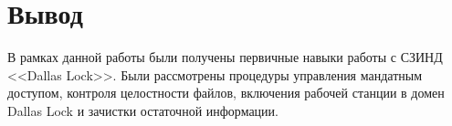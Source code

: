 \chapter{Вывод}

В рамках данной работы были получены первичные навыки работы с СЗИНД <<Dallas Lock>>. Были рассмотрены процедуры управления мандатным доступом, контроля целостности файлов, включения рабочей станции в домен Dallas Lock и зачистки остаточной информации.